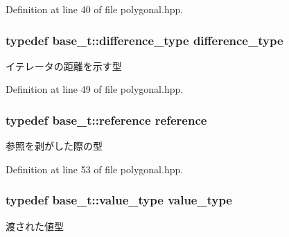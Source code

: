 \-Definition at line 40 of file polygonal.\-hpp.

\hypertarget{classyuh_1_1range__detail_1_1polygonal__iterator_a9ac6039762e1b262cecb98589ffc1d75}{
\subsubsection[{difference\-\_\-type}]{\setlength{\rightskip}{0pt plus 5cm}typedef base\-\_\-t\-::difference\-\_\-type {\bf difference\-\_\-type}}}\label{d9/d0c/classyuh_1_1range__detail_1_1polygonal__iterator_a9ac6039762e1b262cecb98589ffc1d75}
イテレータの距離を示す型 

\-Definition at line 49 of file polygonal.\-hpp.

\hypertarget{classyuh_1_1range__detail_1_1polygonal__iterator_aa5d67140d1557795cc6c30a2849d4e05}{
\subsubsection[{reference}]{\setlength{\rightskip}{0pt plus 5cm}typedef base\-\_\-t\-::reference {\bf reference}}}\label{d9/d0c/classyuh_1_1range__detail_1_1polygonal__iterator_aa5d67140d1557795cc6c30a2849d4e05}
参照を剥がした際の型 

\-Definition at line 53 of file polygonal.\-hpp.

\hypertarget{classyuh_1_1range__detail_1_1polygonal__iterator_ab7468d4ed49b58c84d6c1b71779fb43e}{
\subsubsection[{value\-\_\-type}]{\setlength{\rightskip}{0pt plus 5cm}typedef base\-\_\-t\-::value\-\_\-type {\bf value\-\_\-type}}}\label{d9/d0c/classyuh_1_1range__detail_1_1polygonal__iterator_ab7468d4ed49b58c84d6c1b71779fb43e}
渡された値型 

